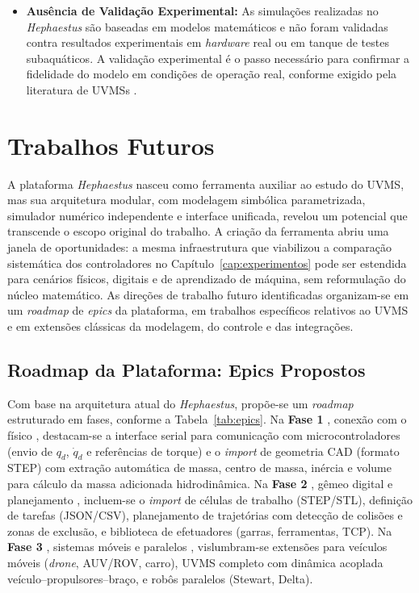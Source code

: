 \begin{itemize}
    \item \textbf{Ausência de Validação Experimental:} As simulações realizadas no \textit{Hephaestus} são baseadas em modelos matemáticos e não foram validadas contra resultados experimentais em \textit{hardware} real ou em tanque de testes subaquáticos. A validação experimental é o passo necessário para confirmar a fidelidade do modelo em condições de operação real, conforme exigido pela literatura de UVMSs \cite{yuh2001underwater, aldhaheri2022underwater, antonelli2014modelling}.
\end{itemize}

\section{Trabalhos Futuros}

A plataforma \textit{Hephaestus} nasceu como ferramenta auxiliar ao estudo do UVMS, mas sua arquitetura modular, com modelagem simbólica parametrizada, simulador numérico independente e interface unificada, revelou um potencial que transcende o escopo original do trabalho. A criação da ferramenta abriu uma janela de oportunidades: a mesma infraestrutura que viabilizou a comparação sistemática dos controladores no Capítulo~\ref{cap:experimentos} pode ser estendida para cenários físicos, digitais e de aprendizado de máquina, sem reformulação do núcleo matemático. As direções de trabalho futuro identificadas organizam-se em um \textit{roadmap} de \textit{epics} da plataforma, em trabalhos específicos relativos ao UVMS e em extensões clássicas da modelagem, do controle e das integrações.

\subsection{Roadmap da Plataforma: Epics Propostos}

Com base na arquitetura atual do \textit{Hephaestus}, propõe-se um \textit{roadmap} estruturado em fases, conforme a Tabela~\ref{tab:epics}. Na \textbf{Fase 1} , conexão com o físico , destacam-se a interface serial para comunicação com microcontroladores (envio de $q_d$, $\dot{q}_d$ e referências de torque) e o \textit{import} de geometria CAD (formato STEP) com extração automática de massa, centro de massa, inércia e volume para cálculo da massa adicionada hidrodinâmica. Na \textbf{Fase 2} , gêmeo digital e planejamento , incluem-se o \textit{import} de células de trabalho (STEP/STL), definição de tarefas (JSON/CSV), planejamento de trajetórias com detecção de colisões e zonas de exclusão, e biblioteca de efetuadores (garras, ferramentas, TCP). Na \textbf{Fase 3} , sistemas móveis e paralelos , vislumbram-se extensões para veículos móveis (\textit{drone}, AUV/ROV, carro), UVMS completo com dinâmica acoplada veículo--propulsores--braço, e robôs paralelos (Stewart, Delta).



